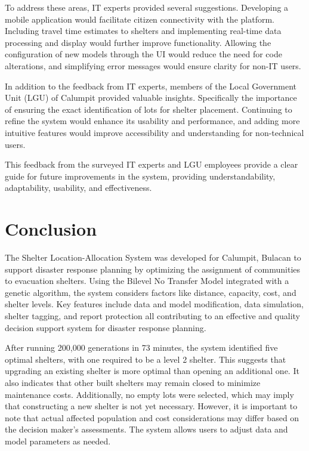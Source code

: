 \documentclass[12pt,a4paper,]{article}
\begin{document}
	To address these areas, IT experts provided several suggestions. Developing a mobile application would facilitate citizen connectivity with the platform. Including travel time estimates to shelters and implementing real-time data processing and display would further improve functionality. Allowing the configuration of new models through the UI would reduce the need for code alterations, and simplifying error messages would ensure clarity for non-IT users.
	
	In addition to the feedback from IT experts, members of the Local Government Unit (LGU) of Calumpit provided valuable insights. Specifically the importance of ensuring the exact identification of lots for shelter placement. Continuing to refine the system would enhance its usability and performance, and adding more intuitive features would improve accessibility and understanding for non-technical users.
	
	This feedback from the surveyed IT experts and LGU employees provide a clear guide for future improvements in the system, providing understandability, adaptability, usability, and effectiveness.
	

\section{Conclusion}

	The Shelter Location-Allocation System was developed for Calumpit, Bulacan to support disaster response planning by optimizing the assignment of communities to evacuation shelters. Using the Bilevel No Transfer Model integrated with a genetic algorithm, the system considers factors like distance, capacity, cost, and shelter levels. Key features include data and model modification, data simulation, shelter tagging, and report protection all contributing to an effective and quality decision support system for disaster response planning. 
	
	After running 200,000 generations in 73 minutes, the system identified five optimal shelters, with one required to be a level 2 shelter. This suggests that upgrading an existing shelter is more optimal than opening an additional one. It also indicates that other built shelters may remain closed to minimize maintenance costs. Additionally, no empty lots were selected, which may imply that constructing a new shelter is not yet necessary. However, it is important to note that actual affected population and cost considerations may differ based on the decision maker's assessments. The system allows users to adjust data and model parameters as needed. 
	
\end{document}
